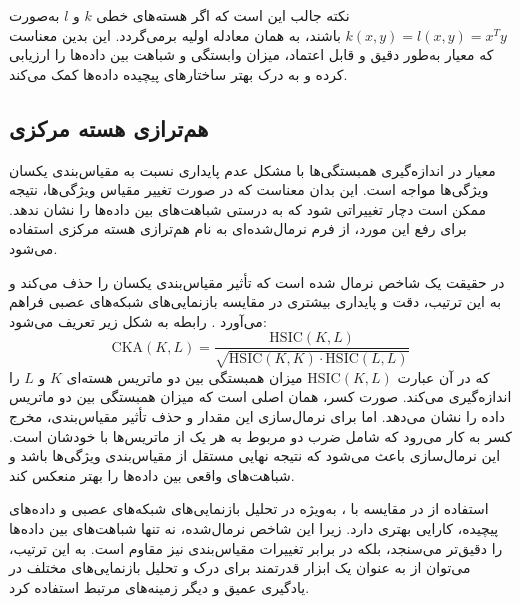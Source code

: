  نکته جالب این است که اگر هسته‌های خطی \(k\) و \(l\) به‌صورت \(k(x, y) = l(x, y) = x^Ty\) باشند،
 به همان معادله اولیه برمی‌گردد. این بدین معناست که معیار 
 به‌طور دقیق و قابل اعتماد، میزان وابستگی و شباهت بین داده‌ها را ارزیابی کرده و به درک بهتر ساختارهای پیچیده داده‌ها کمک می‌کند.
 
 
 \subsection{
 	هم‌ترازی هسته مرکزی%
 }
 معیار
 در اندازه‌گیری همبستگی‌ها با مشکل عدم پایداری نسبت به مقیاس‌بندی یکسان ویژگی‌ها مواجه است. این بدان معناست که در صورت تغییر مقیاس ویژگی‌ها، نتیجه
 ممکن است دچار تغییراتی شود که به درستی شباهت‌های بین داده‌ها را نشان ندهد. برای رفع این مورد، از فرم نرمال‌شده‌ای به نام هم‌ترازی هسته مرکزی استفاده می‌شود.
 
 در حقیقت
 یک شاخص نرمال‌ شده است که تأثیر مقیاس‌بندی یکسان را حذف می‌کند و به این ترتیب، دقت و پایداری بیشتری در مقایسه بازنمایی‌های شبکه‌های عصبی فراهم می‌آورد
 \cite{cortes2012algorithms, cristianini2001kernel}.
 رابطه
 به شکل زیر تعریف می‌شود:
 \begin{equation}
 	\text{CKA}(K, L) = \frac{\text{HSIC}(K, L)}{\sqrt{\text{HSIC}(K, K) \cdot \text{HSIC}(L, L)}}
 	\label{eq_CKA}
 \end{equation}
 که در آن عبارت \(\text{HSIC}(K, L)\) میزان همبستگی بین دو ماتریس هسته‌ای \(K\) و \(L\) را اندازه‌گیری می‌کند. صورت کسر، همان
 اصلی است که میزان همبستگی بین دو ماتریس داده را نشان می‌دهد. اما برای نرمال‌سازی این مقدار و حذف تأثیر مقیاس‌بندی، مخرج کسر به کار می‌رود که شامل ضرب دو
 مربوط به هر یک از ماتریس‌ها با خودشان است. این نرمال‌سازی باعث می‌شود که نتیجه نهایی مستقل از مقیاس‌بندی ویژگی‌ها باشد و شباهت‌های واقعی بین داده‌ها را بهتر منعکس کند.
 
 استفاده از
 در مقایسه با
 ، به‌ویژه در تحلیل بازنمایی‌های شبکه‌های عصبی و داده‌های پیچیده، کارایی بهتری دارد. زیرا این شاخص نرمال‌شده، نه تنها شباهت‌های بین داده‌ها را دقیق‌تر می‌سنجد، بلکه در برابر تغییرات مقیاس‌بندی نیز مقاوم است. به این ترتیب، می‌توان از
 به عنوان یک ابزار قدرتمند برای درک و تحلیل بازنمایی‌های مختلف در یادگیری عمیق و دیگر زمینه‌های مرتبط استفاده کرد.
 
 
 
 
